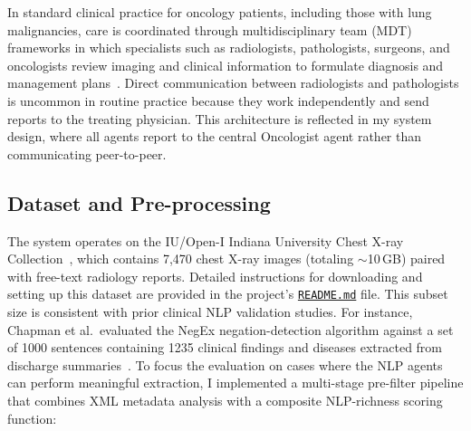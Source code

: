 \documentclass[12pt]{article}
\begin{document}
In standard clinical practice for oncology patients, including those with lung malignancies, care is coordinated through multidisciplinary team (MDT) frameworks in which specialists such as radiologists, pathologists, surgeons, and oncologists review imaging and clinical information to formulate diagnosis and management plans~\cite{pillay2016mdt}. Direct communication between radiologists and pathologists is uncommon in routine practice because they work independently and send reports to the treating physician. This architecture is reflected in my system design, where all agents report to the central Oncologist agent rather than communicating peer-to-peer.

\subsection{Dataset and Pre-processing}
\label{subsec:dataset}

The system operates on the IU/Open-I Indiana University Chest X-ray Collection~\cite{demsar2005openi}, which contains 7,470 chest X-ray images (totaling $\sim$10\,GB) paired with free-text radiology reports. Detailed instructions for downloading and setting up this dataset are provided in the project's \href{https://github.com/sepehrkdi/lung_nodule_mas?tab=readme-ov-file#dataset}{\texttt{README.md}} file. This subset size is consistent with prior clinical NLP validation studies. For instance, Chapman et al.\ evaluated the NegEx negation-detection algorithm against a set of 1000 sentences containing 1235 clinical findings and diseases extracted from discharge summaries~\cite{chapman2001negex}. To focus the evaluation on cases where the NLP agents can perform meaningful extraction, I implemented a multi-stage pre-filter pipeline that combines XML metadata analysis with a composite NLP-richness scoring function:
\end{document}
